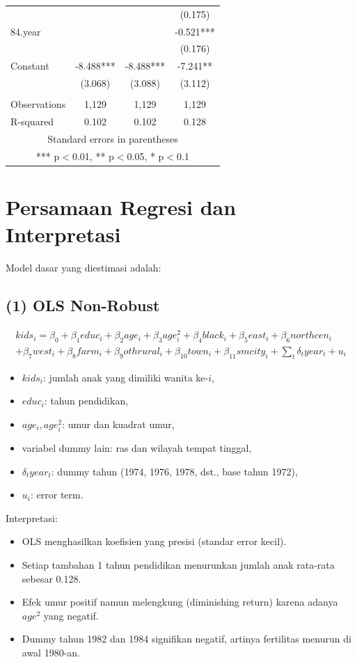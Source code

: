 \documentclass[]{article}
\begin{document}
\begin{table}
\begin{tabular}{lccc}
 &  &  & (0.175) \\
84.year &  &  & -0.521*** \\
 &  &  & (0.176) \\
Constant & -8.488*** & -8.488*** & -7.241** \\
 & (3.068) & (3.088) & (3.112) \\
 &  &  &  \\
Observations & 1,129 & 1,129 & 1,129 \\
 R-squared & 0.102 & 0.102 & 0.128 \\ \hline
\multicolumn{4}{c}{ Standard errors in parentheses} \\
\multicolumn{4}{c}{ *** p$<$0.01, ** p$<$0.05, * p$<$0.1} \\
\end{tabular}
    \label{tab:placeholder}
\end{table}
\section*{Persamaan Regresi dan Interpretasi}

Model dasar yang diestimasi adalah:
\subsection*{(1) OLS Non-Robust}

\begin{align}
kids_i = \beta_0 + \beta_1 educ_i + \beta_2 age_i + \beta_3 age_i^2 
       + \beta_4 black_i + \beta_5 east_i + \beta_6 northcen_i  \nonumber \\
       + \beta_7 west_i + \beta_8 farm_i + \beta_9 othrural_i + \beta_{10} town_i 
       + \beta_{11} smcity_i + \sum_t \delta_t year_t + u_i
\end{align}
\begin{itemize}
    \item $kids_i$: jumlah anak yang dimiliki wanita ke-$i$,
    \item $educ_i$: tahun pendidikan,
    \item $age_i, age_i^2$: umur dan kuadrat umur,
    \item variabel dummy lain: ras dan wilayah tempat tinggal,
    \item $\delta_t year_t$: dummy tahun (1974, 1976, 1978, dst., base tahun 1972),
    \item $u_i$: error term.
\end{itemize}

Interpretasi:
\begin{itemize}
    \item OLS menghasilkan koefisien yang presisi (standar error kecil).
    \item Setiap tambahan 1 tahun pendidikan menurunkan jumlah anak rata-rata sebesar 0.128.
    \item Efek umur positif namun melengkung (diminishing return) karena adanya $age^2$ yang negatif.
    \item Dummy tahun 1982 dan 1984 signifikan negatif, artinya fertilitas menurun di awal 1980-an.
\end{itemize}
\end{document}
